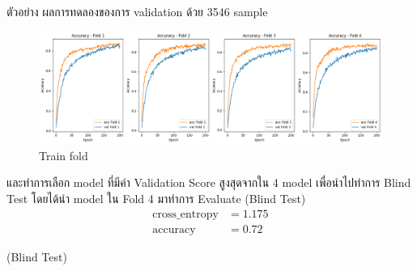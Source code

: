 ตัวอย่าง ผลการทดลองของการ validation ด้วย 3546 sample
\begin{figure}[h]
  \begin{center}
  
  \includegraphics[scale=0.4]{pic/train_fold.png}
  \end{center}
  
  \caption[Train fold]{Train fold}
  \label{fig:Train fold}
  \end{figure}


  และทำการเลือก model ที่มีค่า Validation Score สูงสุดจากใน 4 model  
  เพื่อนำไปทำการ Blind Test 
  โดยได้นำ model ใน  Fold 4   มาทำการ
  Evaluate (Blind Test)
  \begin{align}
    \text{cross\_entropy} &= 1.175 \\
    \text{accuracy} &= 0.72
  \end{align}
 

  (Blind Test)

